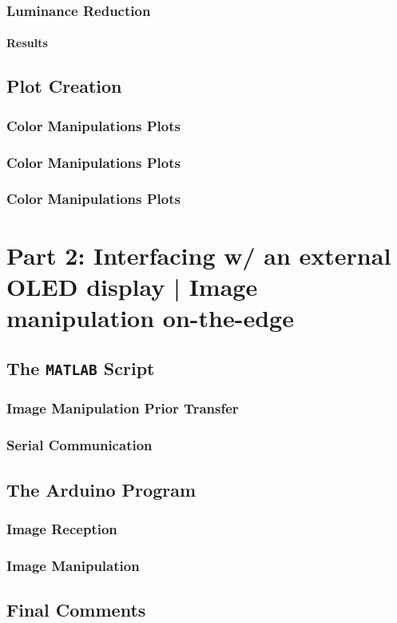 \documentclass[a4paper]{article}
\begin{document}
        \subsubsection{Luminance Reduction}
            \paragraph{Results}

    \subsection{Plot Creation}
        \subsubsection{Color Manipulations Plots}
        \subsubsection{Color Manipulations Plots}
        \subsubsection{Color Manipulations Plots}

%
\section{Part 2: Interfacing w/ an external OLED display | Image manipulation on-the-edge}


    \subsection{The \texttt{MATLAB} Script}
        \subsubsection{Image Manipulation Prior Transfer}
        \subsubsection{Serial Communication}

    \subsection{The Arduino Program}
        \subsubsection{Image Reception}
        \subsubsection{Image Manipulation}

    \subsection{Final Comments}
\end{document}

